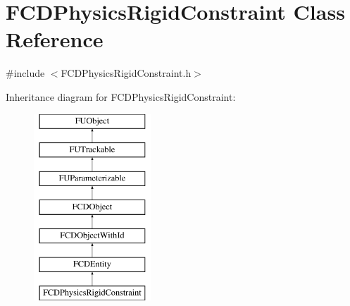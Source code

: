 \hypertarget{classFCDPhysicsRigidConstraint}{
\section{FCDPhysicsRigidConstraint Class Reference}
\label{classFCDPhysicsRigidConstraint}
}


{\ttfamily \#include $<$FCDPhysicsRigidConstraint.h$>$}

Inheritance diagram for FCDPhysicsRigidConstraint:\begin{figure}[H]
\begin{center}
\leavevmode
\includegraphics[height=7.000000cm]{classFCDPhysicsRigidConstraint}
\end{center}
\end{figure}
